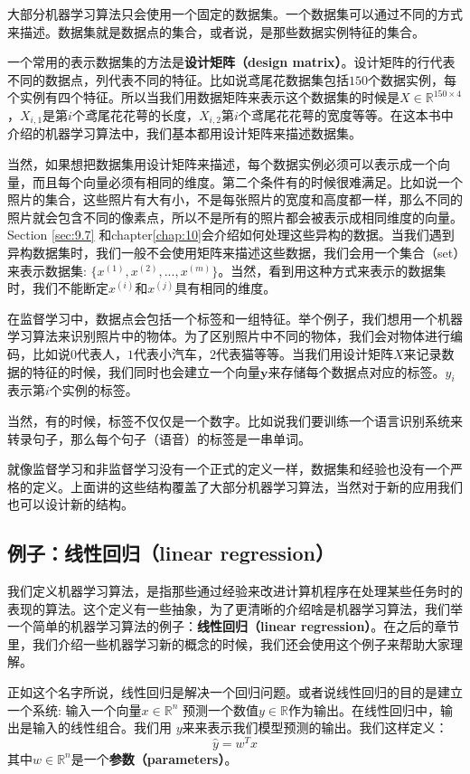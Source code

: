 大部分机器学习算法只会使用一个固定的数据集。一个数据集可以通过不同的方式来描述。数据集就是数据点的集合，或者说，是那些数据实例特征的集合。

一个常用的表示数据集的方法是\textbf{设计矩阵（design matrix）}。设计矩阵的行代表不同的数据点，列代表不同的特征。比如说鸢尾花数据集包括$150$个数据实例，每个实例有四个特征。所以当我们用数据矩阵来表示这个数据集的时候是$X\in \mathbb{R}^{150\times 4}$，$X_{i,1}$是第$i$个鸢尾花花萼的长度，$X_{i,2}$第$i$个鸢尾花花萼的宽度等等。在这本书中介绍的机器学习算法中，我们基本都用设计矩阵来描述数据集。

当然，如果想把数据集用设计矩阵来描述，每个数据实例必须可以表示成一个向量，而且每个向量必须有相同的维度。第二个条件有的时候很难满足。比如说一个照片的集合，这些照片有大有小，不是每张照片的宽度和高度都一样，那么不同的照片就会包含不同的像素点，所以不是所有的照片都会被表示成相同维度的向量。Section \ref{sec:9.7} 和chapter\ref{chap:10}会介绍如何处理这些异构的数据。当我们遇到异构数据集时，我们一般不会使用矩阵来描述这些数据，我们会用一个集合（set）来表示数据集: $\{x^{(1)},x^{(2)},...,x^{(m)}\}$。当然，看到用这种方式来表示的数据集时，我们不能断定$x^{(i)}$和$x^{(j)}$具有相同的维度。

在监督学习中，数据点会包括一个标签和一组特征。举个例子，我们想用一个机器学习算法来识别照片中的物体。为了区别照片中不同的物体，我们会对物体进行编码，比如说$0$代表人，$1$代表小汽车，$2$代表猫等等。当我们用设计矩阵$X$来记录数据的特征的时候，我们同时也会建立一个向量$\textbf{y}$来存储每个数据点对应的标签。$y_i$表示第$i$个实例的标签。

当然，有的时候，标签不仅仅是一个数字。比如说我们要训练一个语言识别系统来转录句子，那么每个句子（语音）的标签是一串单词。

就像监督学习和非监督学习没有一个正式的定义一样，数据集和经验也没有一个严格的定义。上面讲的这些结构覆盖了大部分机器学习算法，当然对于新的应用我们也可以设计新的结构。
\subsection{例子：线性回归（linear regression）}
我们定义机器学习算法，是指那些通过经验来改进计算机程序在处理某些任务时的表现的算法。这个定义有一些抽象，为了更清晰的介绍啥是机器学习算法，我们举一个简单的机器学习算法的例子：\textbf{线性回归（linear regression）}。在之后的章节里，我们介绍一些机器学习新的概念的时候，我们还会使用这个例子来帮助大家理解。

正如这个名字所说，线性回归是解决一个回归问题。或者说线性回归的目的是建立一个系统: 输入一个向量$x\in \mathbb{R}^{n}$ 预测一个数值$y\in \mathbb{R}$作为输出。在线性回归中，输出是输入的线性组合。我们用 $y $来来表示我们模型预测的输出。我们这样定义：
\begin{equation}
    \hat{y}=w^{T}x
\end{equation}
其中$w\in \mathbb{R}^{n}$是一个\textbf{参数（parameters）}。
 
